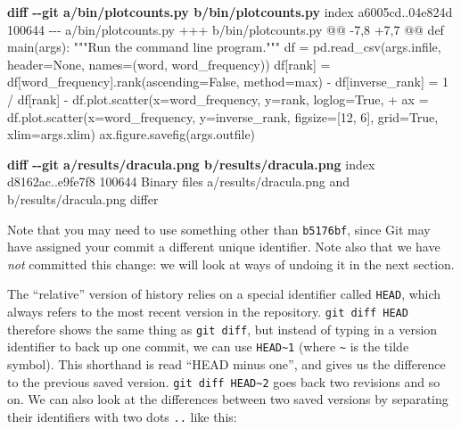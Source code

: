 \documentclass[
]{krantz}
\makeatletter
\newenvironment{Shaded}{\begin{snugshade}}{\end{snugshade}}
\newcommand{\DataTypeTok}[1]{\textcolor[rgb]{0.13,0.29,0.53}{#1}}
\newcommand{\KeywordTok}[1]{\textcolor[rgb]{0.13,0.29,0.53}{\textbf{#1}}}
\newcommand{\NormalTok}[1]{#1}
\newcommand{\StringTok}[1]{\textcolor[rgb]{0.31,0.60,0.02}{#1}}
\newcommand{\VariableTok}[1]{\textcolor[rgb]{0.00,0.00,0.00}{#1}}
\newenvironment{kframe}{%
\medskip{}
\setlength{\fboxsep}{.8em}
 \def\at@end@of@kframe{}%
 \ifinner\ifhmode%
  \def\at@end@of@kframe{\end{minipage}}%
  \begin{minipage}{\columnwidth}%
 \fi\fi%
 \def\FrameCommand##1{\hskip\@totalleftmargin \hskip-\fboxsep
 \colorbox{shadecolor}{##1}\hskip-\fboxsep
     \hskip-\linewidth \hskip-\@totalleftmargin \hskip\columnwidth}%
 \MakeFramed {\advance\hsize-\width
   \@totalleftmargin\z@ \linewidth\hsize
   \@setminipage}}%
 {\par\unskip\endMakeFramed%
 \at@end@of@kframe}
\renewenvironment{Shaded}{\begin{kframe}}{\end{kframe}}
\makeatother
\begin{document}
\begin{Shaded}
\begin{Highlighting}[]
\KeywordTok{diff {-}{-}git a/bin/plotcounts.py b/bin/plotcounts.py}
\NormalTok{index a6005cd..04e824d 100644}
\DataTypeTok{{-}{-}{-} a/bin/plotcounts.py}
\DataTypeTok{+++ b/bin/plotcounts.py}
\DataTypeTok{@@ {-}7,8 +7,7 @@ def main(args):}
\NormalTok{     """Run the command line program."""}
\NormalTok{     df = pd.read\_csv(args.infile, header=None, names=(\textquotesingle{}word\textquotesingle{}, \textquotesingle{}word\_frequency\textquotesingle{}))}
\NormalTok{     df[\textquotesingle{}rank\textquotesingle{}] = df[\textquotesingle{}word\_frequency\textquotesingle{}].rank(ascending=False, method=\textquotesingle{}max\textquotesingle{})}
\StringTok{{-}    df[\textquotesingle{}inverse\_rank\textquotesingle{}] = 1 / df[\textquotesingle{}rank\textquotesingle{}]}
\StringTok{{-}    df.plot.scatter(x=\textquotesingle{}word\_frequency\textquotesingle{}, y=\textquotesingle{}rank\textquotesingle{}, loglog=True,}
\VariableTok{+    ax = df.plot.scatter(x=\textquotesingle{}word\_frequency\textquotesingle{}, y=\textquotesingle{}inverse\_rank\textquotesingle{},}
\NormalTok{                          figsize=[12, 6], grid=True, xlim=args.xlim)}
\NormalTok{     ax.figure.savefig(args.outfile)}

\KeywordTok{diff {-}{-}git a/results/dracula.png b/results/dracula.png}
\NormalTok{index d8162ac..e9fe7f8 100644}
\NormalTok{Binary files a/results/dracula.png and b/results/dracula.png differ}
\end{Highlighting}
\end{Shaded}

Note that you may need to use something other than \texttt{b5176bf},
since Git may have assigned your commit a different unique identifier.
Note also that we have \emph{not} committed this change:
we will look at ways of undoing it in the next section.

The ``relative'' version of history relies on a special identifier called \texttt{HEAD},
which always refers to the most recent version in the repository.
\texttt{git\ diff\ HEAD} therefore shows the same thing as \texttt{git\ diff},
but instead of typing in a version identifier to back up one commit,
we can use \texttt{HEAD\textasciitilde{}1} (where \texttt{\textasciitilde{}} is the tilde symbol).
This shorthand is read ``HEAD minus one'',
and gives us the difference to the previous saved version.
\texttt{git\ diff\ HEAD\textasciitilde{}2} goes back two revisions and so on.
We can also look at the differences between two saved versions
by separating their identifiers with two dots \texttt{..} like this:
\end{document}
